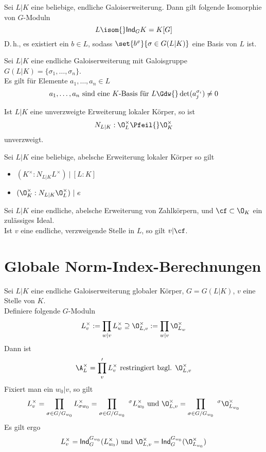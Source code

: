 Sei $L|K$ eine beliebige, endliche Galoiserweiterung. Dann gilt folgende Isomorphie von $G$-Moduln
\[ L \isom{} \textsf{Ind}_GK = K[G] \]
D.\,h., es existiert ein $b \in L$, sodass $\set{b^\sigma}{\sigma \in G(L|K)}$ eine Basis von $L$ ist.

\Lem{}
Sei $L|K$ eine endliche Galoiserweiterung mit Galoisgruppe $G(L|K) = \{\sigma_1, \ldots, \sigma_n\}$.\\
Es gilt für Elemente $a_1,\ldots, a_n \in L$
\[ a_1,\ldots, a_n \text{ sind eine }K\text{-Basis für }L \Gdw{} \det(a_j^{\sigma_i}) \neq 0 \]

\Kor{}
Ist $L|K$ eine unverzweigte Erweiterung lokaler Körper, so ist
\[ N_{L|K} : \O_L^\times \Pfeil{} \O_K^\times \]
unverzweigt.

\Kor{}
Sei $L|K$ eine beliebige, abelsche Erweiterung lokaler Körper so gilt
\begin{itemize}
\item $(K^\times : N_{L|K} L^\times ) ~|~ [L:K]$
\item $(\O_K^\times : N_{L|K} \O_L^\times ) ~|~ e$
\end{itemize}

\Bem{}
Sei $L|K$ eine endliche, abelsche Erweiterung von Zahlkörpern, und $\cf \subset \O_K$ ein zulässiges Ideal.\\
Ist $v$ eine endliche, verzweigende Stelle in $L$, so gilt $v | \cf$.

\section{Globale Norm-Index-Berechnungen}
\Def{}
Sei $L|K$ eine endliche Galoiserweiterung globaler Körper, $G = G(L|K)$, $v$ eine Stelle von $K$.\\
Definiere folgende $G$-Moduln
\[ L_v^\times := \prod_{w|v} L_w^\times \supseteq \O_{L,v}^\times := \prod_{w|v}\O_{L_w}^\times \]
Dann ist
\[ \A_L^\times = \prod'_vL_v^\times \text{ restringiert bzgl. } \O_{L,v}^\times  \]
Fixiert man ein $w_0|v$, so gilt
\[ L_v^\times = \prod_{\sigma \in G/G_{w_0}} L_{\sigma w_0}^\times = \prod_{\sigma \in G/G_{w_0}} \ ^\sigma L_{w_0}^\times \text{ und } \O_{L,v}^\times = \prod_{\sigma \in G/G_{w_0}} \ ^\sigma \O_{L_{w_0}}^\times \]
Es gilt ergo
\[ L^\times_v = \textsf{Ind}_G^{G_{w_0}} (L_{w_0}^\times) \text{ und } \O^\times_{L, v} = \textsf{Ind}_G^{G_{w_0}} (\O_{L_{w_0}}^\times) \]

